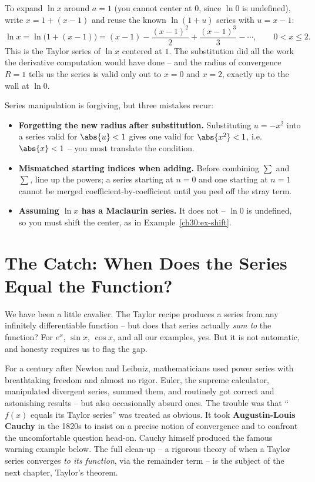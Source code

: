 \begin{example}
\label{ch30:ex-shift}
To expand $\ln x$ around $a = 1$ (you cannot center at $0$, since $\ln 0$ is undefined), write $x = 1 + (x-1)$ and reuse the known $\ln(1+u)$ series with $u = x-1$:
\[
  \ln x = \ln\bigl(1 + (x-1)\bigr)
  = (x-1) - \frac{(x-1)^2}{2} + \frac{(x-1)^3}{3} - \cdots,
  \qquad 0 < x \le 2.
\]
This is the Taylor series of $\ln x$ centered at $1$. The substitution did all the work the derivative computation would have done -- and the radius of convergence $R=1$ tells us the series is valid only out to $x=0$ and $x=2$, exactly up to the wall at $\ln 0$.
\end{example}

\begin{trapbox}
Series manipulation is forgiving, but three mistakes recur:
\begin{itemize}
  \item \textbf{Forgetting the new radius after substitution.} Substituting $u=-x^2$ into a series valid for $\abs{u}<1$ gives one valid for $\abs{x^2}<1$, i.e.\ $\abs{x}<1$ -- you must translate the condition.
  \item \textbf{Mismatched starting indices when adding.} Before combining $\sum$ and $\sum$, line up the powers; a series starting at $n=0$ and one starting at $n=1$ cannot be merged coefficient-by-coefficient until you peel off the stray term.
  \item \textbf{Assuming $\ln x$ has a Maclaurin series.} It does not -- $\ln 0$ is undefined, so you must shift the center, as in Example~\ref{ch30:ex-shift}.
\end{itemize}
\end{trapbox}

\section{The Catch: When Does the Series Equal the Function?}
\label{ch30:sec-catch}

We have been a little cavalier. The Taylor recipe produces a series from any infinitely differentiable function -- but does that series actually \emph{sum to} the function? For $e^x$, $\sin x$, $\cos x$, and all our examples, yes. But it is not automatic, and honesty requires us to flag the gap.

\begin{historybox}
For a century after Newton and Leibniz, mathematicians used power series with breathtaking freedom and almost no rigor. Euler, the supreme calculator, manipulated divergent series, summed them, and routinely got correct and astonishing results -- but also occasionally absurd ones. The trouble was that ``$f(x)$ equals its Taylor series'' was treated as obvious. It took \textbf{Augustin-Louis Cauchy} in the 1820s to insist on a precise notion of convergence and to confront the uncomfortable question head-on. Cauchy himself produced the famous warning example below. The full clean-up -- a rigorous theory of when a Taylor series converges \emph{to its function}, via the remainder term -- is the subject of the next chapter, Taylor's theorem.
\end{historybox}

